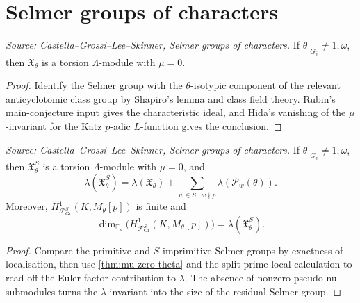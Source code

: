 \section{Selmer groups of characters}

\begin{theorem}[Rubin--Hida \(\mu=0\) theorem]
  \label{thm:mu-zero-theta}
  \textit{Source: Castella--Grossi--Lee--Skinner, Selmer groups of characters.}
  If \(\theta|_{G_{\bar v}}\neq 1,\omega\), then \(\mathfrak{X}_\theta\) is a torsion \(\Lambda\)-module with \(\mu=0\).
\end{theorem}

\begin{proof}
Identify the Selmer group with the \(\theta\)-isotypic component of the relevant anticyclotomic class group by Shapiro's lemma and class field theory. Rubin's main-conjecture input gives the characteristic ideal, and Hida's vanishing of the \(\mu\)-invariant for the Katz \(p\)-adic \(L\)-function gives the conclusion.
\end{proof}

\begin{proposition}
  \label{prop:lambda-theta}
  \textit{Source: Castella--Grossi--Lee--Skinner, Selmer groups of characters.}
  If \(\theta|_{G_{\bar v}}\neq 1,\omega\), then \(\mathfrak{X}_\theta^S\) is a torsion \(\Lambda\)-module with \(\mu=0\), and
  \[
    \lambda(\mathfrak{X}_\theta^S)
    = \lambda(\mathfrak{X}_\theta) + \sum_{w\in S,\; w\nmid p}\lambda(\mathcal{P}_w(\theta)).
  \]
  Moreover, \(H^1_{\mathcal{F}_{\mathrm{Gr}}^S}(K,M_\theta[p])\) is finite and
  \[
    \dim_{\mathbb{F}_p}\bigl(H^1_{\mathcal{F}_{\mathrm{Gr}}^S}(K,M_\theta[p])\bigr)=\lambda(\mathfrak{X}_\theta^S).
  \]
\end{proposition}

\begin{proof}
Compare the primitive and \(S\)-imprimitive Selmer groups by exactness of localisation, then use \cref{thm:mu-zero-theta} and the split-prime local calculation to read off the Euler-factor contribution to \(\lambda\). The absence of nonzero pseudo-null submodules turns the \(\lambda\)-invariant into the size of the residual Selmer group.
\end{proof}

